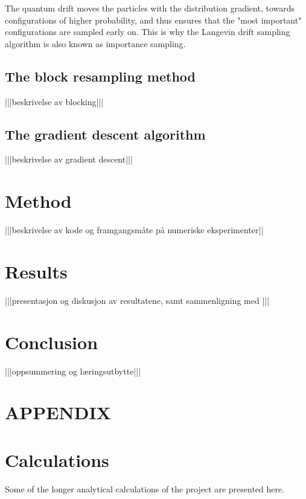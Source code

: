 \documentclass[a4paper,8pt]{article}
\begin{document}
\begin{multicols}{2}
The quantum drift moves the particles with the distribution gradient, towards configurations of higher probability, and thus ensures that the "most important" configurations are sampled early on. This is why the Langevin drift sampling algorithm is also known as importance sampling.

\subsection{The block resampling method}
|||beskrivelse av blocking|||

\subsection{The gradient descent algorithm}
|||beskrivelse av gradient descent|||

\section{Method} \label{method}

|||beskrivelse av kode og framgangsmåte på numeriske eksperimenter||


\section{Results} \label{results}

|||presentasjon og diskusjon av resultatene, samt sammenligning med \cite{SWL}|||


\section{Conclusion}

|||oppsummering og læringsutbytte|||


\end{multicols}




\newpage
\appendix
\setcounter{equation}{0}
\renewcommand{\theequation}{\thesection\arabic{equation}}
\section*{APPENDIX}
\section{Calculations}

Some of the longer analytical calculations of the project are presented here.
\end{document}
